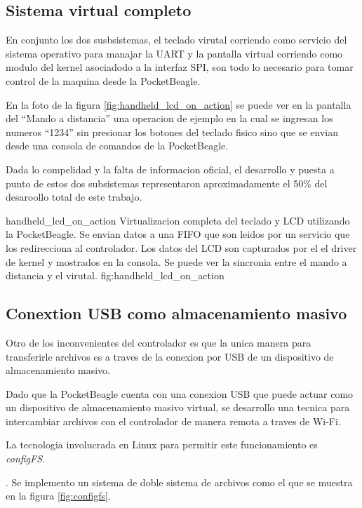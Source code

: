 \subsection{Sistema virtual completo}
      En conjunto los dos susbsistemas, el teclado virutal corriendo como servicio del sistema operativo para manajar la UART y la pantalla virtual corriendo como modulo del kernel asociadodo a la interfaz SPI, son todo lo necesario para tomar control de la maquina desde la PocketBeagle.\par
      En la foto de la figura \ref{fig:handheld_lcd_on_action} se puede ver en la pantalla del ``Mando a distancia'' una operacion de ejemplo en la cual se ingresan los numeros ``1234'' sin presionar los botones del teclado fisico sino que se envian desde una consola de comandos de la PocketBeagle.\par
      Dada lo compelidad y la falta de informacion oficial, el desarrollo y puesta a punto de estos dos subsistemas representaron aproximadamente el 50\% del desaroollo total de este trabajo.\par

         {handheld_lcd_on_action}
         {Virtualizacion completa del teclado y LCD utilizando la PocketBeagle. Se envian datos a una FIFO que son leidos por un servicio que los redirecciona al controlador. Los datos del LCD son capturados por el el driver de kernel y mostrados en la consola. Se puede ver la sincronia entre el mando a distancia y el virutal.}
         {fig:handheld_lcd_on_action}


\subsection{Conextion USB como almacenamiento masivo}
   Otro de los inconvenientes del controlador es que la unica manera para transferirle archivos es a traves de la conexion por USB de un dispositivo de almacenamiento masivo.\par
   Dado que la PocketBeagle cuenta con una conexion USB que puede actuar como un dispositivo de almacenamiento masivo virtual, se desarrollo una tecnica para intercambiar archivos con el controlador de manera remota a traves de Wi-Fi. \par
   La tecnologia involucrada en Linux para permitir este funcionamiento es \textit{configFS}\citep{WEBSITE:configfs}.\par.
   Se implemento un sistema de doble sistema de archivos como el que se muestra en la figura \ref{fig:configfs}.

